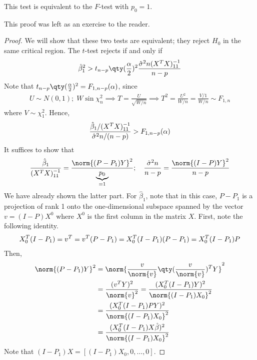 \begin{lemma}
	This test is equivalent to the $F$-test with $p_0 = 1$.
\end{lemma} 

This proof was left as an exercise to the reader.

\begin{proof}
	We will show that these two tests are equivalent; they reject $H_0$ in the same critical region.
	The $t$-test rejects if and only if
	\begin{align*}
		\hat \beta_1^2 > t_{n-p}\qty(\frac{\alpha}{2})^2 \frac{\hat\sigma^2 n (X^\tran X)^{-1}_{11}}{n-p}
	\end{align*}
	Note that $t_{n-p}\qty(\frac{\alpha}{2})^2 = F_{1,n-p}(\alpha)$, since
	\begin{align*}
		U \sim N(0,1);\;W \sin \chi^2_n \implies T = \frac{U}{\sqrt{W/n}} \implies T^2 = \frac{U^2}{W/n} = \frac{V/1}{W/n} \sim F_{1,n}
	\end{align*}
	where $V \sim \chi^2_1$.
	Hence,
	\begin{align*}
		\frac{\hat \beta_1/(X^T X)^{-1}_{11}}{\hat\sigma^2 n/(n-p)} > F_{1,n-p}(\alpha)
	\end{align*}
	It suffices to show that
	\begin{align*}
		\frac{\hat \beta_1}{(X^\tran X)^{-1}_{11}} = \frac{\norm{(P-P_1)Y}^2}{\underbrace{p_0}_{=1}};\quad \frac{\hat \sigma^2 n}{n-p} = \frac{\norm{(I-P)Y}^2}{n-p}
	\end{align*}
	We have already shown the latter part.
	For $\hat \beta_1$, note that in this case, $P - P_1$ is a projection of rank 1 onto the one-dimensional subspace spanned by the vector $v = (I-P)X^0$ where $X^0$ is the first column in the matrix $X$.
	First, note the following identity.
	\begin{align*}
		X_0^T (I - P_1) = v^T = v^T (P-P_1) = X_0^T (I-P_1)(P-P_1) = X_0^T (I-P_1)P
	\end{align*}
	Then,
	\begin{align*}
		\norm{(P-P_1)Y}^2 &= \norm{\frac{v}{\norm{v}} \qty(\frac{v}{\norm{v}})^\tran Y}^2 \\
		&= \frac{(v^\tran Y)^2}{\norm{v}^2} = \frac{(X_0^\tran (I-P_1) Y)^2}{\norm{(I-P_1) X_0}^2} \\
		&= \frac{(X_0^\tran (I-P_1) P Y)^2}{\norm{(I-P_1) X_0}^2} \\
		&= \frac{(X_0^\tran (I-P_1) X \hat\beta)^2}{\norm{(I-P_1) X_0}^2}
	\end{align*}
	Note that $(I-P_1) X = [(I-P_1)X_0, 0, \dots, 0]$.

\end{proof}
